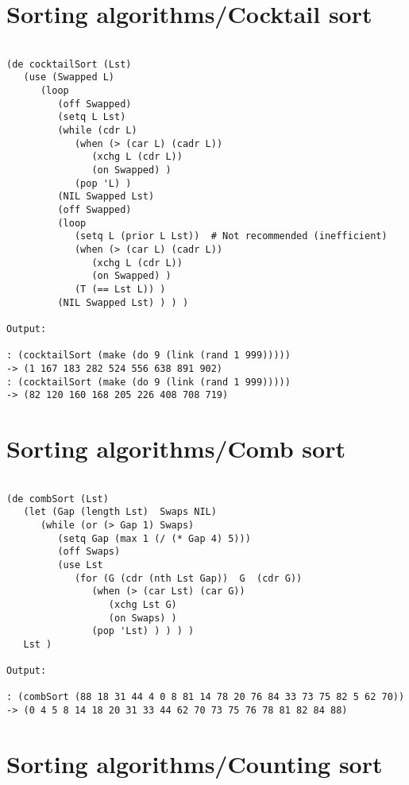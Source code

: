 \section*{Sorting algorithms/Cocktail sort}

\begin{verbatim}

(de cocktailSort (Lst)
   (use (Swapped L)
      (loop
         (off Swapped)
         (setq L Lst)
         (while (cdr L)
            (when (> (car L) (cadr L))
               (xchg L (cdr L))
               (on Swapped) )
            (pop 'L) )
         (NIL Swapped Lst)
         (off Swapped)
         (loop
            (setq L (prior L Lst))  # Not recommended (inefficient)
            (when (> (car L) (cadr L))
               (xchg L (cdr L))
               (on Swapped) )
            (T (== Lst L)) )
         (NIL Swapped Lst) ) ) )

Output:

: (cocktailSort (make (do 9 (link (rand 1 999)))))
-> (1 167 183 282 524 556 638 891 902)
: (cocktailSort (make (do 9 (link (rand 1 999)))))
-> (82 120 160 168 205 226 408 708 719)

\end{verbatim}

\section*{Sorting algorithms/Comb sort}

\begin{verbatim}

(de combSort (Lst)
   (let (Gap (length Lst)  Swaps NIL)
      (while (or (> Gap 1) Swaps)
         (setq Gap (max 1 (/ (* Gap 4) 5)))
         (off Swaps)
         (use Lst
            (for (G (cdr (nth Lst Gap))  G  (cdr G))
               (when (> (car Lst) (car G))
                  (xchg Lst G)
                  (on Swaps) )
               (pop 'Lst) ) ) ) )
   Lst )

Output:

: (combSort (88 18 31 44 4 0 8 81 14 78 20 76 84 33 73 75 82 5 62 70))
-> (0 4 5 8 14 18 20 31 33 44 62 70 73 75 76 78 81 82 84 88)

\end{verbatim}

\section*{Sorting algorithms/Counting sort}

